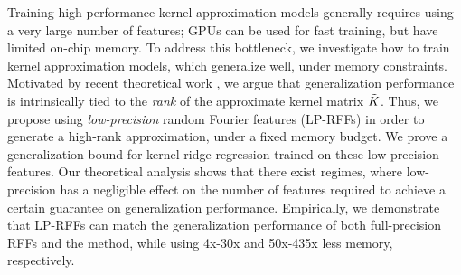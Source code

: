 
Training high-performance kernel approximation models generally requires using a very large number of features; GPUs can be used for fast training, but have limited on-chip memory. To address this bottleneck, we investigate how to train kernel approximation models, which generalize well, under memory constraints. Motivated by recent theoretical work \citep{avron17,musco17}, we argue that generalization performance is intrinsically tied to the \emph{rank} of the approximate kernel matrix $\tilde{K}$. Thus, we propose using \emph{low-precision} random Fourier features (LP-RFFs) in order to generate a high-rank approximation, under a fixed memory budget. We prove a generalization bound for kernel ridge regression trained on these low-precision features. Our theoretical analysis shows that there exist regimes, where low-precision has a negligible effect on the number of features required to achieve a certain guarantee on generalization performance. Empirically, we demonstrate that LP-RFFs can match the generalization performance of both full-precision RFFs and the \Nystrom method, while using 4x-30x and 50x-435x less memory, respectively.
